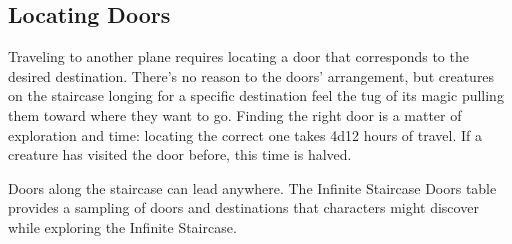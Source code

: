 \documentclass[10pt,a4paper,twoside,bg=print,twocolumn,openany,nodeprecatedcode]{dndbook}
\begin{document}
\subsection{Locating Doors}
Traveling to another plane requires locating a door that corresponds to the desired destination. There's no reason to the doors' arrangement, but creatures on the staircase longing for a specific destination feel the tug of its magic pulling them toward where they want to go. Finding the right door is a matter of exploration and time: locating the correct one takes 4d12 hours of travel. If a creature has visited the door before, this time is halved.

Doors along the staircase can lead anywhere. The Infinite Staircase Doors table provides a sampling of doors and destinations that characters might discover while exploring the Infinite Staircase.
\end{document}
